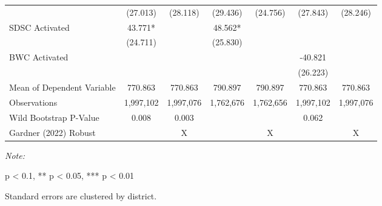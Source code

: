 \begin{table}[H]
\begin{threeparttable}
\begin{tabular}[t]{lcccccc}
\hspace{1em} & (27.013) & (28.118) & (29.436) & (24.756) & (27.843) & (28.246)\\
\hspace{1em}SDSC Activated & 43.771* &  & 48.562* &  &  & \\
\hspace{1em} & (24.711) &  & (25.830) &  &  & \\
\hspace{1em}BWC Activated &  &  &  &  & -40.821 & \\
\hspace{1em} &  &  &  &  & (26.223) & \\
\hspace{1em}Mean of Dependent Variable & 770.863 & 770.863 & 790.897 & 790.897 & 770.863 & 770.863\\
\hspace{1em}Observations & 1,997,102 & 1,997,076 & 1,762,676 & 1,762,656 & 1,997,102 & 1,997,076\\
\hspace{1em}Wild Bootstrap P-Value & 0.008 & 0.003 &  &  & 0.062 & \\
\midrule
Gardner (2022) Robust &  & X &  & X &  & X\\
\bottomrule
\end{tabular}
\begin{tablenotes}
\item \textit{Note: } 
\item * p < 0.1, ** p < 0.05, *** p < 0.01
\item Standard errors are clustered by district.                                      
\end{tablenotes}
\end{threeparttable}
\end{table}
